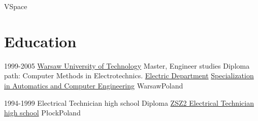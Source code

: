 

    {VSpace}

\section{Education}

\cventry
    {1999-­2005}
    {\href{http://www.pw.edu.pl}
        {Warsaw University of Technology}}
    {{Master, Engineer studies}
        {Diploma path: Computer Methods in Electrotechnics.}}
    {\href{http://www.ee.pw.edu.pl}
        {Electric Department}}
    {\href{http://www.iem.pw.edu.pl}
        {Specialization in Automatics and Computer Engineering}}
    {{Warsaw}{Poland}}

\cventry
    {1994-1999}
    {Electrical Technician high school Diploma}
    {\href{http://www.zsznr2.pl/}
        {ZSZ2 Electrical Technician high school}}
    {Płock}{Poland}{}

